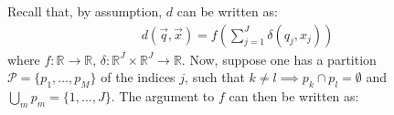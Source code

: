 Recall that, by assumption, $d$ can be written as:
\begin{align*}
        d(\vec{q}, \vec{x}) = f(\sum_{j=1}^J \delta(q_j, x_j))
\end{align*}
where $f: \mathbb{R} \rightarrow \mathbb{R}$, $\delta: \mathbb{R}^J \times \mathbb{R}^J \rightarrow \mathbb{R}$. Now, suppose one has a partition $\mathcal{P} = \{p_1,\ldots,p_M \}$ of the indices $j$, such that $k \ne l \implies p_k \cap p_l = \emptyset$ and $\bigcup_m p_m = \{1,\ldots,J\}$. The argument to $f$ can then be written as:
